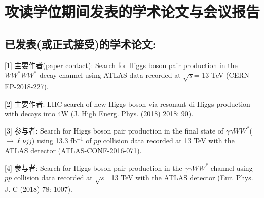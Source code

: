 \chapter{攻读学位期间发表的学术论文与会议报告}






\section*{已发表(或正式接受)的学术论文:}

[1] 主要作者(paper contact): Search for Higgs boson pair production in the $WW^*WW^*$ decay channel using ATLAS data recorded at $\sqrt{s}$= 13 TeV (CERN-EP-2018-227).
 
[2] 主要作者: LHC search of new Higgs boson via resonant di-Higgs production with decays into 4W (J. High Energ. Phys. (2018) 2018: 90). 

[3] 参与者: Search for Higgs boson pair production in the final state of $\gamma\gamma WW^*$($\rightarrow\ell\nu jj$) using 13.3 fb$^{-1}$ of $pp$ collision data recorded at 13 TeV with the ATLAS detector (ATLAS-CONF-2016-071).

[4] 参与者: Search for Higgs boson pair production in the $\gamma\gamma WW^*$ channel using $pp$ collision data recorded at $\sqrt{s}$=13 TeV with the ATLAS detector (Eur. Phys. J. C (2018) 78: 1007).

